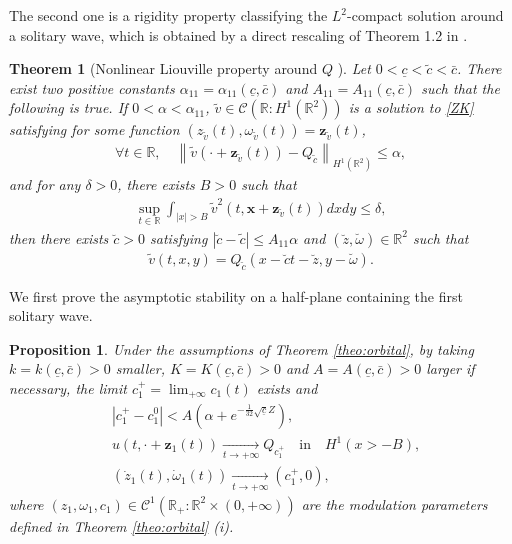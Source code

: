 \documentclass[reqno,10pt]{amsart}
\newtheorem{theo}[lemm]{Theorem}
\newtheorem{propo}[lemm]{Proposition}
\numberwithin{equation}{section}
\newcommand{\bx}{\mathbf{x}}
\newcommand{\bz}{\mathbf{z}}
\begin{document}
 The second one is a rigidity property classifying the $L^2$-compact solution around a solitary wave, which is obtained by a direct rescaling of Theorem 1.2 in \cite{CMPS16}. 
	
	\begin{theo}[Nonlinear Liouville property around $Q$ \cite{CMPS16}]\label{theo:nonlinear_liouville}
      Let $0<\underline{c}<\tilde{c}<\bar{c}$. There exist two positive constants $\alpha_{11}=\alpha_{11}(\underline{c},\bar{c})$ and $A_{11}=A_{11}(\underline{c},\bar{c})$ such that the following is true. 
		If $0<\alpha<\alpha_{11}$, $\tilde{v} \in \mathcal{C}\left( \mathbb{R}:H^1(\mathbb{R}^2) \right)$ is a solution to \ref{ZK} satisfying for some function $(z_{\tilde{v}}(t),\omega_{\tilde{v}}(t))= \bz_{\tilde{v}}(t)$, 
		\begin{align*}
			\forall t \in \mathbb{R}, \quad \left\| \tilde{v}(\cdot+\bz_{\tilde{v}}(t) ) - Q_{\tilde{c}} \right\|_{H^1(\mathbb{R}^2)} \leq \alpha,
		\end{align*}
		and for any $\delta>0$, there exists $B>0$ such that
		\begin{align} \label{decay:2d}
			\sup_{t \in \mathbb{R}} \int_{\vert x \vert>B} \tilde{v}^2 (t, \bx + \bz_{\tilde{v}} (t)) dx dy  \leq \delta,
		\end{align}
		then there exists $\breve{c}>0$ satisfying $\left|\breve{c}-\tilde{c}\right| \le A_{11} \alpha$ and $(\breve{z},\breve{\omega}) \in \mathbb{R}^2$ such that
		\begin{align*}
			\tilde{v}(t,x,y) = Q_{\breve{c}} \left( x- \breve{c} t - \breve{z}, y - \breve{\omega} \right).
		\end{align*}
	\end{theo}

 
 We first prove the asymptotic stability on a half-plane containing the first solitary wave. 
 \begin{propo} \label{propo:asymp:1soliton} Under the assumptions of Theorem \ref{theo:orbital}, by taking $k=k(\underline{c},\bar{c})>0$ smaller, $K=K(\underline{c},\bar{c})>0$ and $A=A(\underline{c},\bar{c})>0$ larger if necessary, the limit $c_1^+=\lim_{+\infty}c_1(t)$ exists and
 \begin{align}
 & |c_1^+-c_1^0|<A \left( \alpha +e^{-\frac{1}{32} \sqrt{\underline{c}} Z}\right), \label{propo:asymp:1soliton.1} \\
 & u \left( t, \cdot + \bz_1(t) \right) \underset{t\rightarrow +\infty}{\longrightarrow} Q_{c_1^+} \quad \text{in} \quad H^1(x >-B), \label{propo:asymp:1soliton.3} \\
 &(\dot{z}_1(t),\dot{\omega}_1(t)) \underset{t \rightarrow + \infty}{\longrightarrow} (c_1^+,0), \label{propo:asymp:1soliton.2}
 \end{align} 
 where $(z_1,\omega_1,c_1) \in \mathcal{C}^1(\mathbb R_+ : \mathbb R^2 \times (0,+\infty))$ are the modulation parameters defined in Theorem \ref{theo:orbital} (i).
 \end{propo}
	
\end{document}
